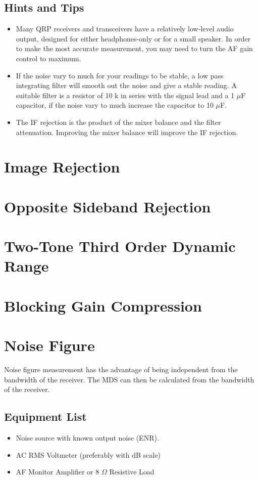 \documentclass[10pt,letterpaper]{book}
\begin{document}
\subsection*{Hints and Tips}
\begin{itemize}
	\item Many QRP receivers and transceivers have a relatively low-level audio output, designed for either headphones-only or for a small speaker. In order to make the most accurate measurement, you may need to turn the AF gain control to maximum.
	\item If the noise vary to much for your readings to be stable, a low pass integrating filter will smooth out the noise and give a stable reading. A suitable filter is a resistor of 10 k in series with the signal lead and a 1 $\mu$F capacitor, if the noise vary to much increase the capacitor to 10 $\mu$F.  
	\item The IF rejection is the product of the mixer balance and the filter attenuation. Improving the mixer balance will improve the IF rejection.
\end{itemize}
\newpage

\section{Image Rejection}
\section{Opposite Sideband Rejection}
\section{Two-Tone Third Order Dynamic Range}
\section{Blocking Gain Compression}
\newpage
\section{Noise Figure}
Noise figure measurement has the advantage of being independent from the bandwidth of the receiver. The MDS can then be calculated from the bandwidth of the receiver.
\subsection*{Equipment List}
\begin{itemize}
	\item Noise source with known output noise (ENR).
	\item AC RMS Voltmeter (preferably with dB scale)
	\item AF Monitor Amplifier or 8 $\Omega$ Resistive Load
\end{itemize}
\end{document}

